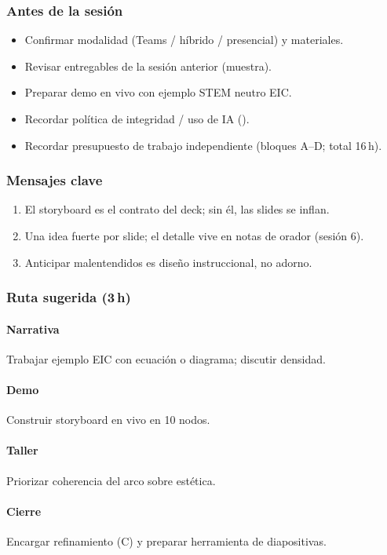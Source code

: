 \subsubsection*{Antes de la sesión}
\begin{itemize}
\item[$\square$] Confirmar modalidad (Teams / híbrido / presencial) y materiales.
\item[$\square$] Revisar entregables de la sesión anterior (muestra).
\item[$\square$] Preparar demo en vivo con ejemplo STEM neutro EIC.
\item[$\square$] Recordar política de integridad / uso de IA (\ceddie).
\item[$\square$] Recordar presupuesto de trabajo independiente (bloques A--D; total 16\,h).
\end{itemize}

\subsubsection*{Mensajes clave}
\begin{enumerate}
\item El storyboard es el contrato del deck; sin él, las slides se inflan.
\item Una idea fuerte por slide; el detalle vive en notas de orador (sesión 6).
\item Anticipar malentendidos es diseño instruccional, no adorno.
\end{enumerate}

\subsubsection*{Ruta sugerida (3\,h)}
\paragraph{Narrativa} Trabajar ejemplo EIC con ecuación o diagrama; discutir densidad.
\paragraph{Demo} Construir storyboard en vivo en 10 nodos.
\paragraph{Taller} Priorizar coherencia del arco sobre estética.
\paragraph{Cierre} Encargar refinamiento (C) y preparar herramienta de diapositivas.

